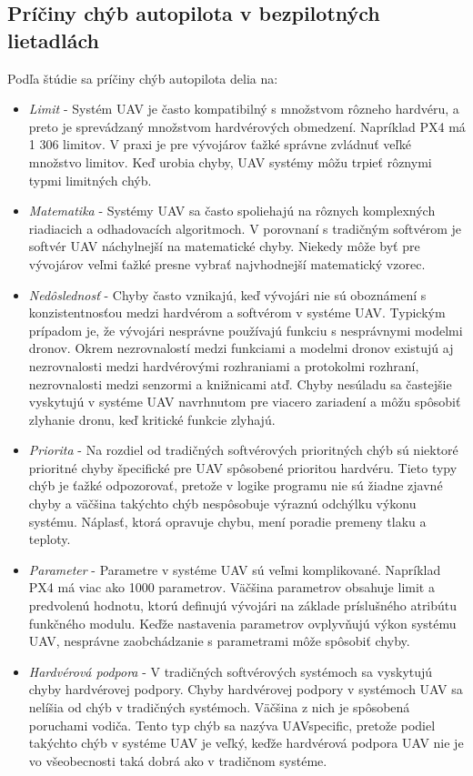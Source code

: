 \documentclass[10pt,twoside,slovak,a4paper]{article}
\begin{document}
\subsection{Príčiny chýb autopilota v bezpilotných lietadlách}

Podľa štúdie sa príčiny chýb autopilota delia na:

\begin{itemize}
\item \emph{Limit} - Systém UAV je často kompatibilný s množstvom rôzneho hardvéru, a preto je sprevádzaný množstvom hardvérových obmedzení. Napríklad PX4 má 1 306 limitov. V praxi je pre vývojárov ťažké správne zvládnuť veľké množstvo limitov. Keď urobia chyby, UAV systémy môžu trpieť rôznymi typmi limitných chýb.
\item \emph{Matematika} - Systémy UAV sa často spoliehajú na rôznych komplexných riadiacich a odhadovacích algoritmoch. V porovnaní s tradičným softvérom je softvér UAV náchylnejší na matematické chyby. Niekedy môže byť pre vývojárov veľmi ťažké presne vybrať najvhodnejší matematický vzorec.
\item \emph{Nedôslednosť} - Chyby často vznikajú, keď vývojári nie sú oboznámení s konzistentnosťou medzi hardvérom a softvérom v systéme UAV. Typickým prípadom je, že vývojári nesprávne používajú funkciu s nesprávnymi modelmi dronov. Okrem nezrovnalostí medzi funkciami a modelmi dronov existujú aj nezrovnalosti medzi hardvérovými rozhraniami a protokolmi rozhraní, nezrovnalosti medzi senzormi a knižnicami atď. Chyby nesúladu sa častejšie vyskytujú v systéme UAV navrhnutom pre viacero zariadení a môžu spôsobiť zlyhanie dronu, keď kritické funkcie zlyhajú.
\item \emph{Priorita} - Na rozdiel od tradičných softvérových prioritných chýb sú niektoré prioritné chyby špecifické pre UAV spôsobené prioritou hardvéru. Tieto typy chýb je ťažké odpozorovať, pretože v logike programu nie sú žiadne zjavné chyby a väčšina takýchto chýb nespôsobuje výraznú odchýlku výkonu systému. Náplasť, ktorá opravuje chybu, mení poradie premeny tlaku a teploty.
\item \emph{Parameter} - Parametre v systéme UAV sú veľmi komplikované. Napríklad PX4
má viac ako 1000 parametrov. Väčšina parametrov obsahuje limit
a predvolenú hodnotu, ktorú definujú vývojári na základe príslušného atribútu funkčného modulu. Keďže nastavenia parametrov ovplyvňujú výkon systému UAV, nesprávne zaobchádzanie s parametrami
môže spôsobiť chyby.
\item \emph{Hardvérová podpora} - V tradičných softvérových systémoch sa vyskytujú chyby hardvérovej podpory. Chyby hardvérovej podpory v systémoch UAV sa nelíšia od chýb v tradičných systémoch. Väčšina z nich je spôsobená poruchami vodiča. Tento typ chýb sa nazýva UAVspecific, pretože podiel takýchto chýb v systéme UAV je veľký, keďže hardvérová podpora UAV nie je vo všeobecnosti taká dobrá ako v tradičnom systéme.

\end{itemize}
\end{document}
